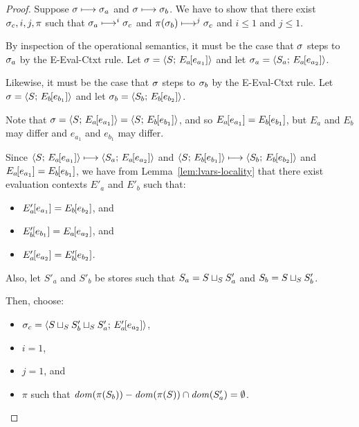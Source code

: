 \begin{proof}
  Suppose $\sigma \longmapsto \sigma_a$ and $\sigma \longmapsto \sigma_b$.  
  We have to show that there exist $\sigma_c, i, j, \pi$ such that
  $\sigma_a \longmapsto^i \sigma_c$ and $\pi(\sigma_b) \longmapsto^j
  \sigma_c$ and $i \leq 1$ and $j \leq 1$.

  By inspection of the operational semantics, it must be the case that
  $\sigma$ steps to $\sigma_a$ by the {\sc E-Eval-Ctxt} rule.  Let
  $\sigma = \langle S;\, E_a\hspace{-1mm}\left[e_{a_1}\right] \rangle$ and let $\sigma_a =
  \langle S_a;\, E_a\hspace{-1mm}\left[e_{a_2}\right] \rangle$.

  Likewise, it must be the case that $\sigma$ steps to $\sigma_b$ by the
  {\sc E-Eval-Ctxt} rule.  Let $\sigma =
  \langle S;\, E_b\hspace{-1mm}\left[e_{b_1}\right] \rangle$ and let $\sigma_b =
  \langle S_b;\, E_b\hspace{-1mm}\left[e_{b_2}\right] \rangle$.

  Note that $\sigma = \langle S;\, E_a\hspace{-1mm}\left[e_{a_1}\right] \rangle =
  \langle S;\, E_b\hspace{-1mm}\left[e_{b_1}\right] \rangle$, and so
  $E_a\hspace{-1mm}\left[e_{a_1}\right] = E_b\hspace{-1mm}\left[e_{b_1}\right]$, but $E_a$ and
  $E_b$ may differ and $e_{a_1}$ and $e_{b_1}$ may differ.

  Since $\langle S;\, E_a\hspace{-1mm}\left[e_{a_1}\right] \rangle \longmapsto
  \langle S_a;\, E_a\hspace{-1mm}\left[e_{a_2}\right] \rangle$ and
  $\langle S;\, E_b\hspace{-1mm}\left[e_{b_1}\right] \rangle \longmapsto
  \langle S_b;\, E_b\hspace{-1mm}\left[e_{b_2}\right] \rangle$ and $E_a\hspace{-1mm}\left[e_{a_1}\right]
  = E_b\hspace{-1mm}\left[e_{b_1}\right]$, we have from
  Lemma~\ref{lem:lvars-locality} that there exist evaluation contexts
  $E'_a$ and $E'_b$ such that:

  \begin{itemize}
  \item $E'_a\hspace{-1mm}\left[e_{a_1}\right] = E_b\hspace{-1mm}\left[e_{b_2}\right]$, and
  \item $E'_b\hspace{-1mm}\left[e_{b_1}\right] = E_a\hspace{-1mm}\left[e_{a_2}\right]$, and
  \item $E'_a\hspace{-1mm}\left[e_{a_2}\right] =
  E'_b\hspace{-1mm}\left[e_{b_2}\right]$.
  \end{itemize}

  Also, let $S'_a$ and $S'_b$ be stores such that $S_a =
  S \sqcup_{S} S'_a$ and $S_b = S \sqcup_{S} S'_b$.

  Then, choose:
  \begin{itemize}
  \item $\sigma_c =
    \langle S \sqcup_{S} S'_b \sqcup_{S} S'_a;\, E'_a\hspace{-1mm}\left[e_{a_2}\right] \rangle$,
  \item $i = 1$,
  \item $j= 1$, and
  \item $\pi$ such that $\mathit{dom}(\pi(S_b)) - \mathit{dom}(\pi(S)) \cap \mathit{dom}(S'_a)
    = \emptyset$.
  \end{itemize}


\end{proof}

